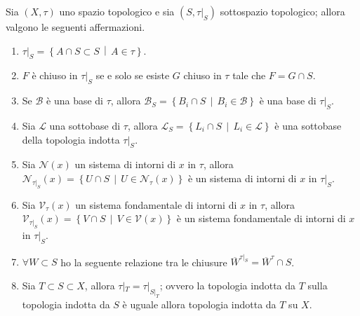 \begin{theorem}
	\label{thr:proprieties_induced_top}
	Sia $(X,\tau)$ uno spazio topologico e sia $(S, \tau|_S)$ sottospazio topologico; allora valgono le seguenti affermazioni.
	\begin{enumerate}
		\item $\tau|_S = \left\{A \cap S \subset S \,\middle|\, A \in \tau \right\}$.
		\item $F$ è chiuso in $\tau|_S$ se e solo se esiste $G$ chiuso in $\tau$ tale che $F = G \cap S$.
		\item Se $\mathcal{B}$ è una base di $\tau$, allora $\mathcal{B}_S = \left\{B_i \cap S \,\middle|\, B_i \in \mathcal{B}\right\}$ è una base di $\tau|_S$.
		\item Sia $\mathcal{L}$ una sottobase di $\tau$, allora $\mathcal{L}_S = \left\{ L_i \cap S \,\middle|\, L_i \in \mathcal{L}\right\}$ è una sottobase della topologia indotta $\tau|_S$.
		\item Sia $\mathcal{N}(x)$ un sistema di intorni di $x$ in $\tau$, allora $\mathcal{N}_{\tau|_S}(x) = \left\{U \cap S \,\middle|\, U \in \mathcal{N}_\tau(x)\right\}$ è un sistema di intorni di $x$ in $\tau|_S$.
		\item Sia $\mathcal{V}_\tau(x)$ un sistema fondamentale di intorni di $x$ in $\tau$, allora $\mathcal{V}_{\tau|_S}(x) = \left\{ V \cap S \,\middle|\, V \in \mathcal{V}(x)\right\}$ è un sistema fondamentale di intorni di $x$ in $\tau|_S$.
		\item $\forall W \subset S$ ho la seguente relazione tra le chiusure $\overline{W}^{\tau|_S} = \overline{W}^{\tau} \cap S$.
		\item Sia $T \subset S \subset X$, allora $\tau|_T = \tau|_{S|_T}$; ovvero la topologia indotta da $T$ sulla topologia indotta da $S$ è uguale allora topologia indotta da $T$ su $X$.
	\end{enumerate}
\end{theorem}

